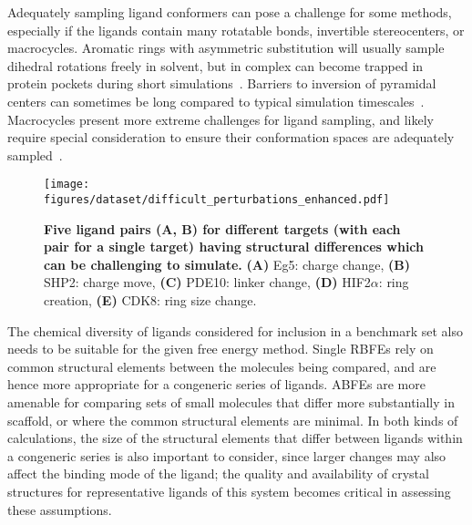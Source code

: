 \documentclass[9pt,bestpractices,pubversion]{livecoms}
\begin{document}
Adequately sampling ligand conformers can pose a challenge for some methods, especially if the ligands contain many rotatable bonds, invertible stereocenters, or macrocycles.
Aromatic rings with asymmetric substitution will usually sample dihedral rotations freely in solvent, but in complex can become trapped in protein pockets during short simulations~\cite{kaus_how_2015,sasmal_sampling_2020}. 
Barriers to inversion of pyramidal centers can sometimes be long compared to typical simulation timescales~\cite{koeppl1967inversion}.
Macrocycles present more extreme challenges for ligand sampling, and likely require special consideration to ensure their conformation spaces are adequately sampled~\cite{wagner_computational_2017,yu_accurate_2017,paulsen_evaluation_2020}. 

\begin{figure}[!ht]
    \centering
    \texttt{[image: figures/dataset/difficult\_perturbations\_enhanced.pdf]}
    \caption{\textbf{Five ligand pairs (A, B) for different targets (with each pair for a single target)
    having structural differences which can be challenging to simulate.}
    \textbf{(A)} Eg5: charge change,
    \textbf{(B)} SHP2: charge move,
    \textbf{(C)} PDE10: linker change,
    \textbf{(D)} HIF2$\alpha$: ring creation,
    \textbf{(E)} CDK8: ring size change. 
    }
    \label{fig:difficult_perturbations}
\end{figure}

The chemical diversity of ligands considered for inclusion in a benchmark set also needs to be suitable for the given free energy method. 
Single RBFEs rely on common structural elements between the molecules being compared, and are hence more appropriate for a congeneric series of ligands. 
%
ABFEs are more amenable for comparing sets of small molecules that differ more substantially in scaffold, or where the common structural elements are minimal. 
In both kinds of calculations, the size of the structural elements that differ between ligands within a congeneric series is also important to consider, since larger changes may also affect the binding mode of the ligand; the quality and availability of crystal structures for representative ligands of this system becomes critical in assessing these assumptions.
\end{document}
